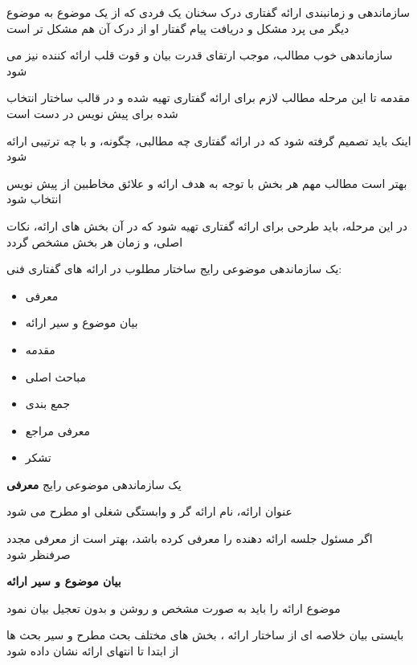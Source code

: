 \documentclass[14pt]{beamer}
\makeatletter
\newcommand{\rtlist}{\raggedleft\rightskip\@totalleftmargin}
\newcommand{\framefontsizelarge}{\fontsize{18pt}{0pt}\selectfont}
\newcommand{\frametitlefontsize}{\fontsize{20pt}{0pt}\selectfont}
\makeatother
\begin{document}
\begin{persian}
\begin{frame}[plain]{\frametitlefontsize سازماندهی و زمانبندی ارائه گفتاری}
		درک سخنان یک فردی که از یک موضوع به موضوع دیگر می پرد مشکل و دریافت پیام گفتار او از درک آن هم مشکل تر است
		
		سازماندهی خوب مطالب، موجب ارتقای قدرت بیان و قوت قلب ارائه کننده نیز می شود
	\end{frame}	
	
	\begin{frame}[plain]{\frametitlefontsize مقدمه}
		\framefontsizelarge
		تا این مرحله مطالب لازم برای ارائه گفتاری تهیه شده و در قالب ساختار انتخاب شده برای پیش نویس در دست است
		
		اینک باید تصمیم گرفته شود که در ارائه گفتاری چه مطالبی، چگونه، و با چه ترتیبی ارائه شود
		
		بهتر است مطالب مهم هر بخش با توجه به هدف ارائه و علائق مخاطبین از پیش نویس انتخاب شود
		
		در این مرحله، باید طرحی برای ارائه گفتاری تهیه شود که در آن بخش های ارائه، نکات اصلی، و زمان هر بخش مشخص گردد
	\end{frame}	
	
	\begin{frame}[plain]{\frametitlefontsize یک سازماندهی موضوعی رایج}
		\framefontsizelarge
		ساختار مطلوب در ارائه های گفتاری فنی:
		\begin{itemize}\rtlist
			\item معرفی
			\item بیان موضوع و سیر ارائه
			\item مقدمه
			\item مباحث اصلی
			\item جمع بندی
			\item معرفی مراجع
			\item تشکر
		\end{itemize}
	\end{frame}		

	\begin{frame}[plain]{\frametitlefontsize یک سازماندهی موضوعی رایج}
		\framefontsizelarge
		\textbf{معرفی}
		
		عنوان ارائه، نام ارائه گر و وابستگی شغلی او مطرح می شود
		
		اگر مسئول جلسه ارائه دهنده را معرفی کرده باشد، بهتر است از معرفی مجدد صرفنظر شود
		
		\textbf{بیان موضوع و سیر ارائه}
		
		موضوع ارائه را باید به صورت مشخص و روشن و بدون تعجیل بیان نمود
		
		بایستی بیان خلاصه ای از ساختار ارائه ، بخش های مختلف بحث مطرح و سیر بحث ها از ابتدا تا انتهای ارائه نشان داده شود
		

\end{frame}
\end{persian}
\end{document}
